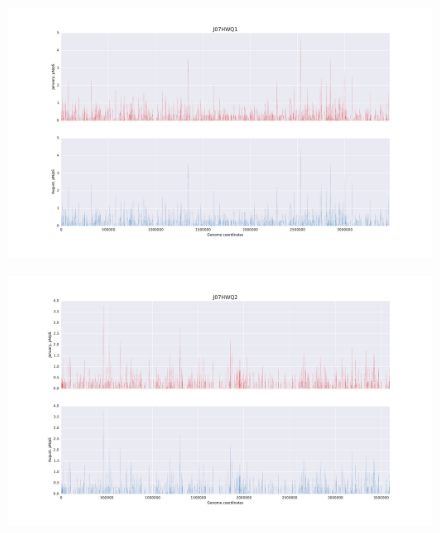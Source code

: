 \begin{figure}[p]
  \centering
  \includegraphics[width=\textwidth,height=\textheight,keepaspectratio]{Chapter5/Figures/pn_ps_plots/J07HWQ1_pNpS_density.pdf}
  \caption{}
  \label{J07HWQ1_pNpS}
\end{figure}

\begin{figure}[p]
  \centering
  \includegraphics[width=\textwidth,height=\textheight,keepaspectratio]{Chapter5/Figures/pn_ps_plots/J07HWQ2_pNpS_density.pdf}
  \caption{}
  \label{J07HWQ2_pNpS}
\end{figure}



